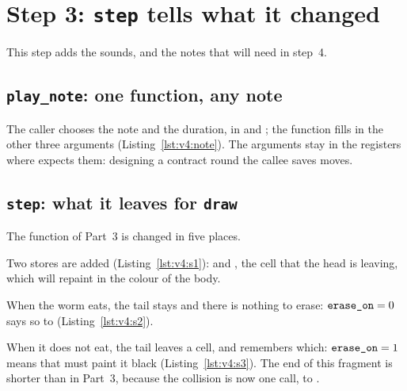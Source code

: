 \section{Step 3: \texttt{step} tells what it changed}

This step adds the sounds, and the notes that  will need in
step~4.

\subsection{\texttt{play\_note}: one function, any note}


The caller chooses the note and the duration, in  and ; the
function fills in the other three arguments
(Listing~\ref{lst:v4:note}). The arguments stay in the registers where
 expects them: designing a contract round the callee
saves moves.

\subsection{\texttt{step}: what it leaves for \texttt{draw}}

The function  of Part~3 is changed in five places.


Two stores are added (Listing~\ref{lst:v4:s1}):  and
, the cell that the head is leaving, which  will
repaint in the colour of the body.


When the worm eats, the tail stays and there is nothing to erase:
$\texttt{erase\_on}=0$ says so to  (Listing~\ref{lst:v4:s2}).


When it does not eat, the tail leaves a cell, and  remembers
which: $\texttt{erase\_on}=1$ means that  must paint it black
(Listing~\ref{lst:v4:s3}). The end of this fragment is shorter than in
Part~3, because the collision is now one call, to .

